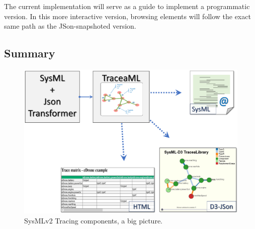 The current implementation will serve as a guide to implement a programmatic version. In this more interactive version, browsing elements will follow the exact same path as the JSon-snapshoted version.

\subsection{Summary}
\begin{figure}[h]     
	\centering
	\includegraphics[width=.75\linewidth]{images/traceaml.pdf}
	\caption{SysMLv2 Tracing components, a big picture.}
	\label{fig:traceaml}
\end{figure}
